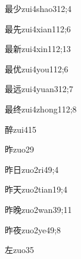 \begin{verbete}{最少}{zui4shao3}{12;4}
\end{verbete}

\begin{verbete}{最先}{zui4xian1}{12;6}
\end{verbete}

\begin{verbete}{最新}{zui4xin1}{12;13}
\end{verbete}

\begin{verbete}{最优}{zui4you1}{12;6}
\end{verbete}

\begin{verbete}{最远}{zui4yuan3}{12;7}
\end{verbete}

\begin{verbete}{最终}{zui4zhong1}{12;8}
\end{verbete}

\begin{verbete}{醉}{zui4}{15}
\end{verbete}

\begin{verbete}{昨}{zuo2}{9}
\end{verbete}

\begin{verbete}{昨日}{zuo2ri4}{9;4}
\end{verbete}

\begin{verbete}{昨天}{zuo2tian1}{9;4}
\end{verbete}

\begin{verbete}{昨晚}{zuo2wan3}{9;11}
\end{verbete}

\begin{verbete}{昨夜}{zuo2ye4}{9;8}
\end{verbete}

\begin{verbete}{左}{zuo3}{5}
\end{verbete}


